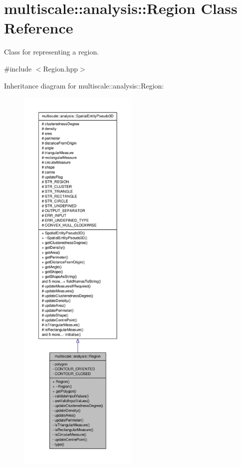 \hypertarget{classmultiscale_1_1analysis_1_1Region}{\section{multiscale\-:\-:analysis\-:\-:\-Region \-Class \-Reference}
\label{classmultiscale_1_1analysis_1_1Region}
}


\-Class for representing a region.  




{\ttfamily \#include $<$\-Region.\-hpp$>$}



\-Inheritance diagram for multiscale\-:\-:analysis\-:\-:\-Region\-:\nopagebreak
\begin{figure}[H]
\begin{center}
\leavevmode
\includegraphics[height=550pt]{classmultiscale_1_1analysis_1_1Region__inherit__graph}
\end{center}
\end{figure}
